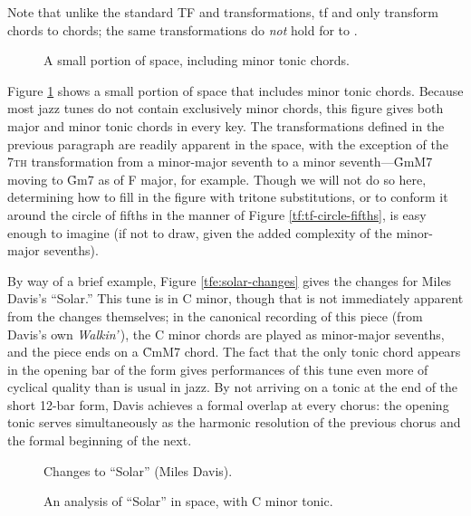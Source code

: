 \noindent Note that unlike the standard TF and \tft transformations, tf and
\tfmt only transform \V chords to \I chords; the same
transformations do \emph{not} hold for \ii to \V.

\begin{figure}[tbhp]
  \caption{A small portion of \tf space, including minor tonic chords.}
  \label{tfe:tf-minor-tonics}
\end{figure}

Figure \ref{tfe:tf-minor-tonics} shows a small portion of \tf space that
includes minor tonic chords. Because most jazz tunes do not contain
exclusively minor chords, this figure gives both major and minor tonic chords
in every key. The transformations defined in the previous paragraph are
readily apparent in the space, with the exception of the \textsc{7th}
transformation from a minor-major seventh to a minor seventh---\h{GmM7} moving
to \h{Gm7} as \ii of F major, for example. Though we will not do so
here, determining how to fill in the figure with tritone substitutions, or to
conform it around the circle of fifths in the manner of Figure
\ref{tf:tf-circle-fifths}, is easy enough to imagine (if not to draw, given
the added complexity of the minor-major sevenths).

By way of a brief example, Figure \ref{tfe:solar-changes} gives the changes
for Miles Davis's ``Solar.'' This tune is in C minor, though that is not
immediately apparent from the changes themselves; in the canonical recording
of this piece (from Davis's own \emph{Walkin'}\,), the C minor chords are
played as minor-major sevenths, and the piece ends on a \h{CmM7}
chord.\nocite{davis:walkin} The fact that the only tonic chord appears in the
opening bar of the form gives performances of this tune even more of cyclical
quality than is usual in jazz. By not arriving on a tonic at the end of the
short 12-bar form, Davis achieves a formal overlap at every chorus: the
opening tonic serves simultaneously as the harmonic resolution of the previous
chorus and the formal beginning of the next.

\begin{figure}[tp]
  \caption{Changes to ``Solar'' (Miles Davis).}
  \label{tfe:solar-changes}

  \vspace{4em}

  \caption{An analysis of ``Solar'' in \tf space, with C minor tonic.}
  \label{tfe:solar-space}
\end{figure}

